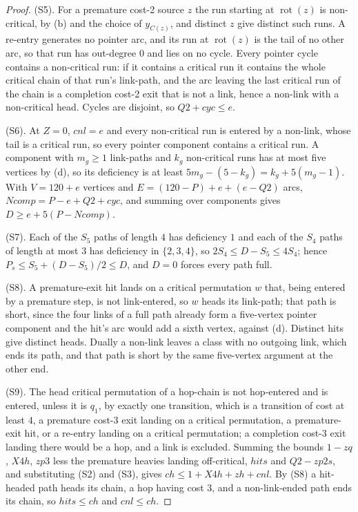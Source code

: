 \documentclass[10pt]{article}
\theoremstyle{remark}
\theoremstyle{plain}
\newcommand{\NCh}{\mathit{ch}}
\newcommand{\Ncyc}{\mathit{cyc}}
\newcommand{\rot}{\operatorname{rot}}
\begin{document}
\begin{proof}
(S5).  For a premature cost-2 source $z$ the run starting at $\rot(z)$
is non-critical, by (b) and the choice of $y_{C(z)}$, and distinct $z$
give distinct such runs.  A re-entry generates no pointer arc, and its
run at $\rot(z)$ is the tail of no other arc, so that run has
out-degree $0$ and lies on no cycle.  Every pointer cycle contains a
non-critical run: if it contains a critical run it contains the whole
critical chain of that run's link-path, and the arc leaving the last
critical run of the chain is a completion cost-2 exit that is not a
link, hence a non-link with a non-critical head.  Cycles are disjoint,
so $Q2+\Ncyc\le e$.

(S6).  At $Z=0$, $\mathit{cnl}=e$ and every non-critical run is
entered by a non-link, whose tail is a critical run, so every pointer
component contains a critical run.  A component with $m_g\ge 1$
link-paths and $k_g$ non-critical runs has at most five vertices by
(d), so its deficiency is at least $5m_g-(5-k_g)=k_g+5(m_g-1)$.  With
$V=120+e$ vertices and $E=(120-P)+e+(e-Q2)$ arcs,
$\mathit{Ncomp}=P-e+Q2+\Ncyc$, and summing over components gives
$D\ge e+5(P-\mathit{Ncomp})$.

(S7).  Each of the $S_5$ paths of length $4$ has deficiency $1$ and
each of the $S_4$ paths of length at most $3$ has deficiency in
$\{2,3,4\}$, so $2S_4\le D-S_5\le 4S_4$; hence
$P_s\le S_5+(D-S_5)/2\le D$, and $D=0$ forces every path full.

(S8).  A premature-exit hit lands on a critical permutation $w$ that,
being entered by a premature step, is not link-entered, so $w$ heads
its link-path; that path is short, since the four links of a full path
already form a five-vertex pointer component and the hit's arc would
add a sixth vertex, against (d).  Distinct hits give distinct heads.
Dually a non-link leaves a class with no outgoing link, which ends its
path, and that path is short by the same five-vertex argument at the
other end.

(S9).  The head critical permutation of a hop-chain is not hop-entered
and is entered, unless it is $q_1$, by exactly one transition, which
is a transition of cost at least $4$, a premature cost-3 exit landing
on a critical permutation, a premature-exit hit, or a re-entry landing
on a critical permutation; a completion cost-3 exit landing there
would be a hop, and a link is excluded.  Summing the bounds $1-zq$,
$X4h$, $zp3$ less the premature heavies landing off-critical,
$\mathit{hits}$ and $Q2-zp2s$, and substituting (S2) and (S3), gives
$\NCh\le 1+X4h+zh+\mathit{cnl}$.  By (S8) a hit-headed path heads its
chain, a hop having cost $3$, and a non-link-ended path ends its chain,
so $\mathit{hits}\le\NCh$ and $\mathit{cnl}\le\NCh$.


\end{proof}
\end{document}
